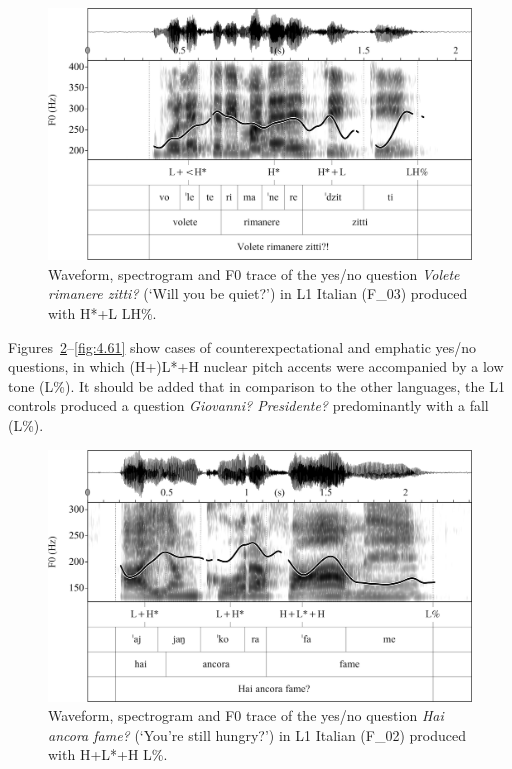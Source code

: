 \begin{figure}


\includegraphics[width=\textwidth]{figures/Figure_4.59.png}



\caption{Waveform, spectrogram and F0 trace of the yes/no question \textit{Volete rimanere zitti?} (‘Will you be quiet?’) in L1 Italian (F\_03) produced with H*+L LH\%.}
\label{fig:4.59}
\end{figure}

Figures~\ref{fig:4.60}--\ref{fig:4.61} show cases of counterexpectational and emphatic yes/no questions, in which (H+)L*+H nuclear pitch accents were accompanied by a low tone (L\%). It should be added that in comparison to the other languages, the L1 controls produced a question \textit{Giovanni? Presidente?} predominantly with a fall (L\%).

\begin{figure}


\includegraphics[width=\textwidth]{figures/Figure_4.60.png}



\caption{Waveform, spectrogram and F0 trace of the yes/no question \textit{Hai ancora fame?} (‘You’re still hungry?’) in L1 Italian (F\_02) produced with H+L*+H L\%.}
\label{fig:4.60}
\end{figure}

